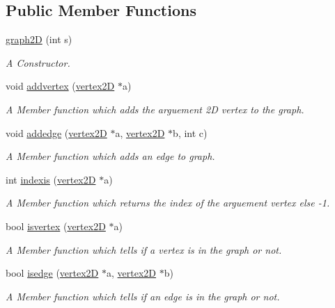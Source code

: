 \subsection*{Public Member Functions}
\begin{DoxyCompactItemize}
\item 
\hyperlink{classgraph2D_a4702eac5247e6a9c9336b212b105dddf}{graph2D} (int s)
\begin{DoxyCompactList}\small\item\em A Constructor. \end{DoxyCompactList}\item 
void \hyperlink{classgraph2D_a0bc80a8850d11d49722f30fd0081dc1e}{addvertex} (\hyperlink{classvertex2D}{vertex2D} $\ast$a)
\begin{DoxyCompactList}\small\item\em A Member function which adds the arguement 2D vertex to the graph. \end{DoxyCompactList}\item 
void \hyperlink{classgraph2D_a1ec89f9154f7a06ca9440c54114a5ae8}{addedge} (\hyperlink{classvertex2D}{vertex2D} $\ast$a, \hyperlink{classvertex2D}{vertex2D} $\ast$b, int c)
\begin{DoxyCompactList}\small\item\em A Member function which adds an edge to graph. \end{DoxyCompactList}\item 
int \hyperlink{classgraph2D_a49365267df78a75819ef8a8647a514d0}{indexis} (\hyperlink{classvertex2D}{vertex2D} $\ast$a)
\begin{DoxyCompactList}\small\item\em A Member function which returns the index of the arguement vertex else -\/1. \end{DoxyCompactList}\item 
bool \hyperlink{classgraph2D_a82180cab2d84b3ec314b9941a600227c}{isvertex} (\hyperlink{classvertex2D}{vertex2D} $\ast$a)
\begin{DoxyCompactList}\small\item\em A Member function which tells if a vertex is in the graph or not. \end{DoxyCompactList}\item 
bool \hyperlink{classgraph2D_a81175519185c21347127968da495ce75}{isedge} (\hyperlink{classvertex2D}{vertex2D} $\ast$a, \hyperlink{classvertex2D}{vertex2D} $\ast$b)
\begin{DoxyCompactList}\small\item\em A Member function which tells if an edge is in the graph or not. \end{DoxyCompactList}\item 

\end{DoxyCompactItemize}
